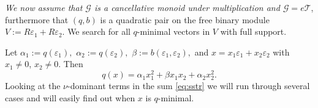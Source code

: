 \documentclass [12pt,a4paper,reqno]{amsart}
\begin{document}
\emph{We now assume that ${\mathcal G}$ is a cancellative monoid under multiplication and ${\mathcal G}= e {\mathcal T}$}, furthermore that $(q,b)$ is a quadratic pair on the free binary module
$V:=R{\varepsilon}_1+R{\varepsilon}_2.$ We search for all $q$-minimal vectors in $V$ with full support.

Let ${\alpha} _1:=q({\varepsilon}_1),$ ${\alpha} _2:=q({\varepsilon}_2),$ ${\beta} :=b({\varepsilon}_1,{\varepsilon}_2),$ and $x = x_1 {\varepsilon}_1 + x_2 {\varepsilon}_2$ with $x_1 \neq 0$, $x_2 \neq 0$. Then
\begin{equation}\label{eq:sstr}
q(x) = {\alpha}_1 x_1^2 + {\beta} x_1 x_2 + {\alpha}_2 x_2^2.
\tag{$\ast \ast$}
\end{equation}
Looking at the $\nu$-dominant terms in the sum \eqref{eq:sstr} we will run through several cases and will easily find out when $x$ is $q$-minimal.
\end{document}
